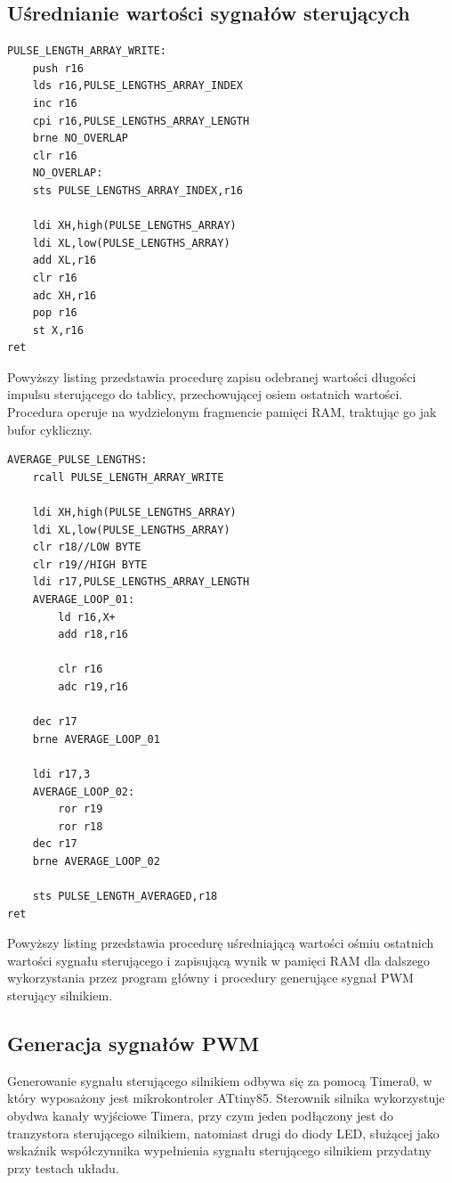 \subsection{Uśrednianie wartości sygnałów sterujących}

\begin{lstlisting}
PULSE_LENGTH_ARRAY_WRITE:
	push r16
	lds r16,PULSE_LENGTHS_ARRAY_INDEX
	inc r16
	cpi r16,PULSE_LENGTHS_ARRAY_LENGTH
	brne NO_OVERLAP
	clr r16
	NO_OVERLAP:
	sts PULSE_LENGTHS_ARRAY_INDEX,r16	

	ldi XH,high(PULSE_LENGTHS_ARRAY)
	ldi XL,low(PULSE_LENGTHS_ARRAY)
	add XL,r16
	clr r16
	adc XH,r16
	pop r16
	st X,r16
ret
\end{lstlisting}

Powyższy listing przedstawia procedurę zapisu odebranej wartości długości impulsu sterującego do tablicy, przechowującej osiem ostatnich wartości. Procedura operuje na wydzielonym fragmencie pamięci RAM, traktując go jak bufor cykliczny. 

\begin{lstlisting}
AVERAGE_PULSE_LENGTHS:
	rcall PULSE_LENGTH_ARRAY_WRITE

	ldi XH,high(PULSE_LENGTHS_ARRAY)
	ldi XL,low(PULSE_LENGTHS_ARRAY)
	clr r18//LOW BYTE
	clr r19//HIGH BYTE
	ldi r17,PULSE_LENGTHS_ARRAY_LENGTH
	AVERAGE_LOOP_01:
		ld r16,X+
		add r18,r16

		clr r16
		adc r19,r16

	dec r17
	brne AVERAGE_LOOP_01
	
	ldi r17,3
	AVERAGE_LOOP_02:
		ror r19
		ror r18
	dec r17
	brne AVERAGE_LOOP_02

	sts PULSE_LENGTH_AVERAGED,r18
ret
\end{lstlisting}

Powyższy listing przedstawia procedurę uśredniającą wartości ośmiu ostatnich wartości sygnału sterującego i zapisującą wynik w pamięci RAM dla dalszego wykorzystania przez program główny i procedury generujące sygnał PWM sterujący silnikiem.

\subsection{Generacja sygnałów PWM}

Generowanie sygnału sterującego silnikiem odbywa się za pomocą Timera0, w który wyposażony jest mikrokontroler ATtiny85. Sterownik silnika wykorzystuje obydwa kanały wyjściowe Timera, przy czym jeden podłączony jest do tranzystora sterującego silnikiem, natomiast drugi do diody LED, służącej jako wskaźnik współczynnika wypełnienia sygnału sterującego silnikiem przydatny przy testach układu. 

